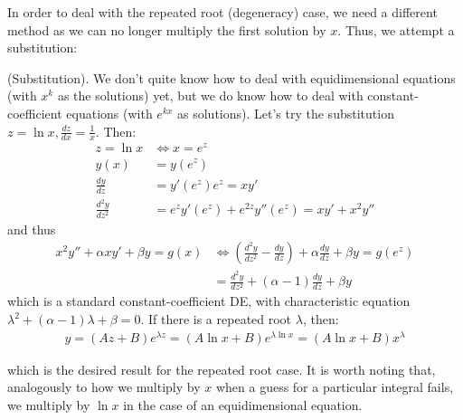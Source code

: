 \documentclass{article}
\begin{document}
In order to deal with the repeated root (degeneracy) case, we need a different method as we can no longer multiply the first solution by $x$. Thus, we attempt a substitution:
\begin{method}
    (Substitution). We don't quite know how to deal with equidimensional equations (with $x^k$ as the solutions) yet, but we do know how to deal with constant-coefficient equations (with $e^{kx}$ as solutions). Let's try the substitution $z=\ln x, \frac{dz}{dx} = \frac{1}{x}$. Then:
    \begin{equation*}
        \begin{aligned}
            z = \ln x &\iff x = e^z \\
            y(x) &= y(e^z) \\
            \frac{dy}{dz} &= y'(e^z) e^z = xy' \\
            \frac{d^2y}{dz^2} &= e^z y'(e^z) + e^{2z}y''(e^z) = xy' + x^2y''
        \end{aligned}
    \end{equation*}
    and thus 
    \begin{equation*}
        \begin{aligned}
            x^2 y'' + \alpha x y' + \beta y = g(x) &\iff (\frac{d^2 y}{dz^2} - \frac{dy}{dz}) + \alpha \frac{dy}{dz} + \beta y = g(e^z) \\
            &= \frac{d^2 y}{dz^2} + (\alpha - 1)\frac{dy}{dz} + \beta y 
        \end{aligned}
    \end{equation*}
    which is a standard constant-coefficient DE, with characteristic equation $\lambda^2 + (\alpha-1)\lambda + \beta =0 $. If there is a repeated root $\lambda$, then:
    \begin{equation*}
        \begin{aligned}
            y = (Az+B)e^{\lambda z} = (A\ln x + B)e^{\lambda \ln x} = (A\ln x + B)x^{\lambda}
        \end{aligned}
    \end{equation*}
\end{method}
which is the desired result for the repeated root case. It is worth noting that, analogously to how we multiply by $x$ when a guess for a particular integral fails, we multiply by $\ln x$ in the case of an equidimensional equation.
\end{document}
